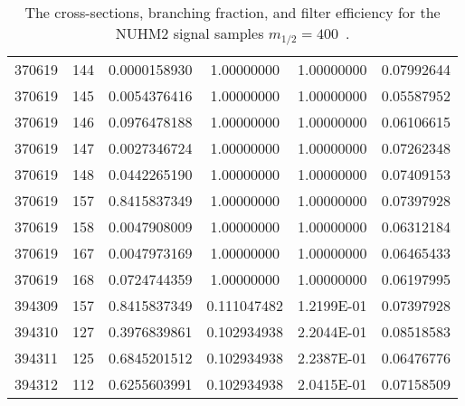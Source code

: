 \begin{table}[htp]
{{\begin{tabular}{cccccc}
370619 & 144 & 0.0000158930 & 1.00000000 & 1.00000000 & 0.07992644\\
370619 & 145 & 0.0054376416 & 1.00000000 & 1.00000000 & 0.05587952\\
370619 & 146 & 0.0976478188 & 1.00000000 & 1.00000000 & 0.06106615\\
370619 & 147 & 0.0027346724 & 1.00000000 & 1.00000000 & 0.07262348\\
370619 & 148 & 0.0442265190 & 1.00000000 & 1.00000000 & 0.07409153\\
370619 & 157 & 0.8415837349 & 1.00000000 & 1.00000000 & 0.07397928\\
370619 & 158 & 0.0047908009 & 1.00000000 & 1.00000000 & 0.06312184\\
370619 & 167 & 0.0047973169 & 1.00000000 & 1.00000000 & 0.06465433\\
370619 & 168 & 0.0724744359 & 1.00000000 & 1.00000000 & 0.06197995\\ 
394309 & 157 & 0.8415837349 & 0.111047482 & 1.2199E-01 & 0.07397928\\
394310 & 127 & 0.3976839861 & 0.102934938 & 2.2044E-01 & 0.08518583\\
394311 & 125 & 0.6845201512 & 0.102934938 & 2.2387E-01 & 0.06476776\\
394312 & 112 & 0.6255603991 & 0.102934938 & 2.0415E-01 & 0.07158509\\
\hline
\hline
\end{tabular}
}
}
\caption{The cross-sections, branching fraction, and filter efficiency for the NUHM2 signal samples $m_{1/2} = 400$~{\GeV}.}
\label{tab:app_xsec_m12_400}
\end{table}%


